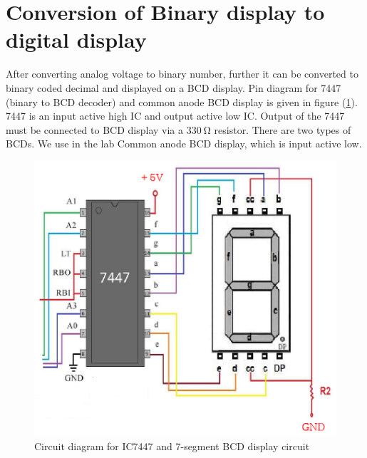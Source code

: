 \documentclass[%
 reprint,
nofootinbib,
 amsmath,amssymb,
 aps,
floatfix,
]{revtex4-2}
\begin{document}
\section{Conversion of Binary display to digital display}
    After converting analog voltage to binary number, further it can be converted to binary coded decimal and displayed on a BCD display. Pin diagram for 7447 (binary to BCD decoder) and common anode BCD display is given in figure (\ref{fig:bcd}). 7447 is an input active high IC and output active low IC. Output of the 7447 must be connected to BCD display via a $\SI{330}{\ohm}$ resistor. There are two types of BCDs. We use in the lab Common anode BCD display, which is input active low.
    \begin{figure}
        \centering
        \includegraphics[scale = 0.85]{Figures/7447-decoder.png}
        \caption{Circuit diagram for IC7447 and 7-segment BCD display circuit}
        \label{fig:bcd}
    \end{figure}
\end{document}
